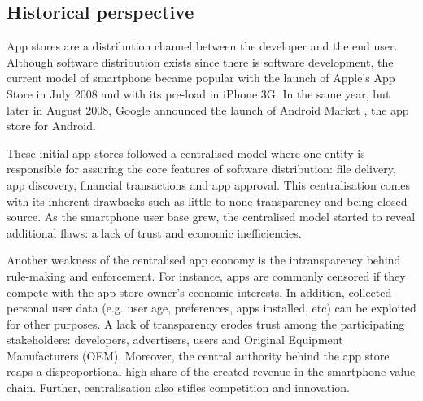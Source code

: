 \medskip

\subsection{Historical perspective}

App stores are a distribution channel between the developer and the end user. Although software distribution exists since there is software development, the current model of smartphone became popular with the launch of Apple's App Store in July 2008 and with its pre-load in iPhone 3G. In the same year, but later in August 2008, Google announced the launch of Android Market \cite{wiki:market}, the app store for Android.

\medskip

These initial app stores followed a centralised model where one entity is responsible for assuring the core features of software distribution: file delivery, app discovery, financial transactions and app approval. This centralisation comes with its inherent drawbacks such as little to none transparency and being closed source. As the smartphone user base grew, the centralised model started to reveal additional flaws: a lack of trust and economic inefficiencies.

\medskip

Another weakness of the centralised app economy is the intransparency behind rule-making and enforcement. For instance, apps are commonly censored if they compete with the app store owner's economic interests. In addition, collected personal user data (e.g. user age, preferences, apps installed, etc) can be exploited for other purposes. A lack of transparency erodes trust among the participating stakeholders: developers, advertisers, users and Original Equipment Manufacturers (OEM). Moreover, the central authority behind the app store reaps a disproportional high share of the created revenue in the smartphone value chain. Further, centralisation also stifles competition and innovation.

